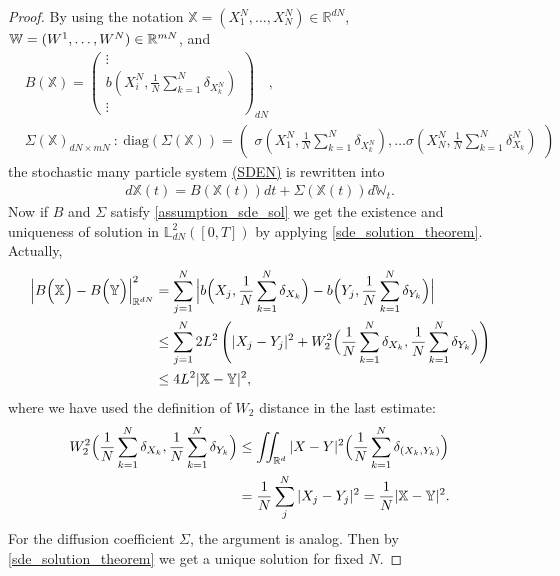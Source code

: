 \begin{proof} 
  By using the notation $\mathbb{X} = (X_1^{N},\ldots ,X_N^{N}  ) \in  \mathbb{R}^{dN} $, $\mathbb{W} = (W^{1},\ldots ,W^{N}  )\in\mathbb{R}^{mN}$, and
  \begin{align*}
    &B(\mathbb{X}) = \begin{pmatrix} \vdots \\ b(X_i^{N},\frac{1}{N}\sum_{k=1}^{N}  \delta_{X_k^N} )\\ \vdots \end{pmatrix}_{dN}, \\ 
    &\Sigma(\mathbb{X})_{dN \times mN} \ : \ \text{diag}(\Sigma(\mathbb{X})) = \begin{pmatrix} \sigma(X^N_1,\frac{1}{N}\sum_{k=1}^{N} \delta_{X^N_k} ), \ldots \sigma(X^N_N,\frac{1}{N}\sum_{k=1}^{N} \delta^N_{X_k} ) \end{pmatrix}
  \end{align*}
  the stochastic many particle system \hyperref[sden]{(SDEN)} is rewritten into
  \begin{align*}
    d \mathbb{X}(t) = B(\mathbb{X}(t)) dt + \Sigma(\mathbb{X}(t)) d \mathbb{W}_t
  .\end{align*}
  Now if $B$ and $\Sigma $ satisfy \autoref{assumption_sde_sol} we get the existence and uniqueness of solution in $\mathbb{L}^{2}_{dN}([0,T]) $ by applying \autoref{sde_solution_theorem}. Actually,
  \begin{align*}
    \Big| B\Big(\mathbb{X}\Big)-B\Big(\mathbb{Y}\Big)\Big|_{\mathbb{R}^{dN} }^2  &= \sum_{j=1}^{N} \Big|b\Big(X_j,\frac{1}{N}\sum_{k=1}^{N} \delta_{X_k}\Big)  - b\Big(Y_j,\frac{1}{N}\sum_{k=1}^{N} \delta_{Y_k} \Big)\Big|  \\
                           &\le \sum_{j=1}^{N} 2L^2 \left( \lvert X_j-Y_j\rvert^2  + W_2^2\Big(\frac{1}{N}\sum_{k=1}^{N} \delta_{X_k},\frac{1}{N}\sum_{k=1}^{N} \delta_{Y_k} \Big)\right)   \\
                                                            &\le  4L^2 |\mathbb{X} - \mathbb{Y}|^2 
  ,\end{align*}
  where we have used the definition of $W_2$ distance in the last estimate:
  \begin{align*}
W_2^2\Big(\frac{1}{N}\sum_{k=1}^{N} \delta_{X_k},\frac{1}{N}\sum_{k=1}^{N} \delta_{Y_k} \Big)&\leq \iint_{\mathbb{R}^d} |X-Y|^2 \Big(\frac{1}{N}\sum^N_{k=1}\delta_{(X_k,Y_k)}\Big)  \\
&=\dfrac{1}{N}\sum^N_{j}|X_j-Y_j|^2=\frac{1}{N}|\mathbb{X}-\mathbb{Y}|^2.
\end{align*}
  For the diffusion coefficient $\Sigma $, the argument is analog. 
  Then by \autoref{sde_solution_theorem} we get a unique solution for fixed $N$.
\end{proof}


